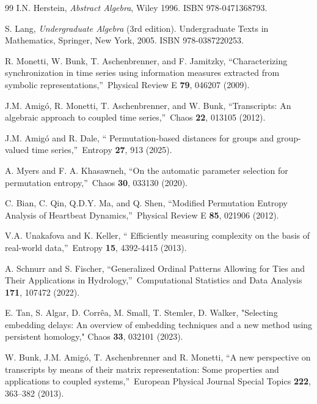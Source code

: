 \documentclass[%
 aip,
 amsmath,amssymb,
 reprint,%
]{revtex4-1}
\begin{document}
\begin{thebibliography}{99}
 I.N. Herstein, \textit{Abstract Algebra}, Wiley 1996.
ISBN 978-0471368793.

 S. Lang, \textit{Undergraduate Algebra} (3rd edition).
Undergraduate Texts in Mathematics, Springer, New York, 2005. ISBN
978-0387220253.

 R. Monetti, W. Bunk, T. Aschenbrenner, and F.
Jamitzky, \textquotedblleft Characterizing synchronization in time series
using information measures extracted from symbolic
representations,\textquotedblright\ Physical Review E \textbf{79}, 046207
(2009).

 J.M. Amig\'{o}, R. Monetti, T. Aschenbrenner, and W.
Bunk, \textquotedblleft Transcripts: An algebraic approach to coupled time
series,\textquotedblright\ Chaos \textbf{22}, 013105 (2012).

 J.M. Amig\'{o} and R. Dale, \textquotedblleft
Permutation-based distances for groups and group-valued time
series,\textquotedblright\ Entropy \textbf{27}, 913 (2025).

 A. Myers and F. A. Khasawneh, \textquotedblleft On the
automatic parameter selection for permutation entropy,\textquotedblright\
Chaos \textbf{30}, 033130 (2020).

 C. Bian, C. Qin, Q.D.Y. Ma, and Q. Shen, \textquotedblleft Modified Permutation Entropy Analysis of Heartbeat Dynamics,\textquotedblright\ Physical Review E \textbf{85}, 021906 (2012).

 V.A. Unakafova and K. Keller, \textquotedblleft
Efficiently measuring complexity on the basis of real-world
data,\textquotedblright\ Entropy \textbf{15}, 4392-4415 (2013).

 A. Schnurr and S. Fischer, \textquotedblleft Generalized Ordinal Patterns Allowing for Ties and Their Applications in Hydrology,\textquotedblright\ Computational Statistics and Data Analysis \textbf{171}, 107472 (2022).
    
 E. Tan, S. Algar, D. Corrêa, M. Small, T. Stemler, D. Walker, "Selecting embedding delays: An overview of embedding techniques and a new method using persistent homology," Chaos \textbf{33}, 032101 (2023). %

 W. Bunk, J.M. Amig\'{o}, T. Aschenbrenner and R. Monetti,
\textquotedblleft A new perspective on transcripts by means of their matrix
representation: Some properties and applications to coupled
systems,\textquotedblright\ European Physical Journal Special Topics \textbf{%
222}, 363--382 (2013).


\end{thebibliography}
\end{document}
